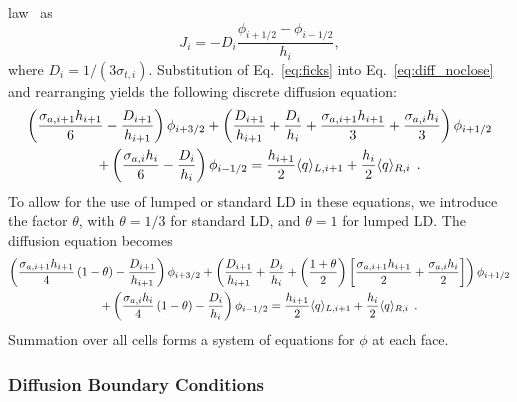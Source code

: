 law~\cite{stacy}
as \begin{equation}\label{eq:ficks}
    J_{i} = -D_i \frac{\phi_{i+1/2} - \phi_{i-1/2}}{h_i},
\end{equation}
where $D_i = 1/(3\sigma_{t,i})$.
Substitution of Eq.~\eqref{eq:ficks} into Eq.~\eqref{eq:diff_noclose} and rearranging yields the following discrete diffusion
equation:
\begin{multline}
        \left(\frac{\sigma_{a,i+1} h_{i+1}}{6} -
        \frac{D_{i+1}}{h_{i+1}}\right)\phi_{i+3/2} + \left(\frac{D_{i+1}}{h_{i+1}} +
        \frac{D_{i}}{h_i} + \frac{\sigma_{a,i+1} h_{i+1}}{3} + \frac{\sigma_{a,i}
        h_{i}}{3}\right)\phi_{i+1/2} \\ + \left(\frac{\sigma_{a,i} h_{i}}{6} -
        \frac{D_{i}}{h_{i}}\right)\phi_{i-1/2} = \frac{h_{i+1}}{2} \langle q \rangle_{L,i+1} +
        \frac{h_{i}}{2}\langle q \rangle_{R,i}\;\,. 
\end{multline}
To allow for the use of lumped
or standard LD in these equations, we introduce the factor $\theta$, with
$\theta=1/3$ for standard
LD, and $\theta=1$ for lumped LD.  The diffusion equation becomes
\begin{multline}
    \left(\frac{\sigma_{a,i+1} h_{i+1}}{4}\left(1 - \theta\right)  -
        \frac{D_{i+1}}{h_{i+1}}\right)\phi_{i+3/2} + \left(\frac{D_{i+1}}{h_{i+1}} +
        \frac{D_{i}}{h_i} + \left(\frac{1+\theta}{2} \right)\left[\frac{\sigma_{a,i+1} h_{i+1}}{2} + \frac{\sigma_{a,i}
        h_{i}}{2}\right]\right)\phi_{i+1/2} \\ + \left(\frac{\sigma_{a,i}
        h_{i}}{4}\left(1 - \theta\right) -
        \frac{D_{i}}{h_{i}}\right)\phi_{i-1/2} = \frac{h_{i+1}}{2} \langle q \rangle_{L,i+1} +
        \frac{h_{i}}{2}\langle q \rangle_{R,i}
        \;\,. 
\end{multline}
Summation over all cells forms a system of equations for $\phi$ at each face.  

\subsubsection{Diffusion Boundary Conditions}

